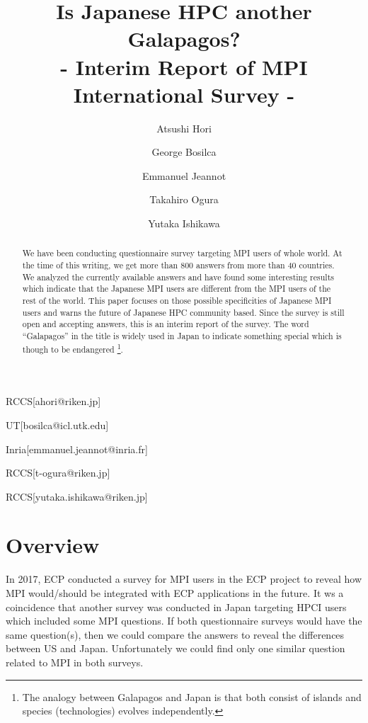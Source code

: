 \documentclass[submit,techrep,noauthor,english]{ipsj}
\begin{document}
\title{Is Japanese HPC another Galapagos?\\
- Interim Report of MPI International Survey -}


\author{Atsushi Hori}{RCCS}[ahori@riken.jp]
\author{George Bosilca}{UT}[bosilca@icl.utk.edu]
\author{Emmanuel Jeannot}{Inria}[emmanuel.jeannot@inria.fr]
\author{Takahiro Ogura}{RCCS}[t-ogura@riken.jp]
\author{Yutaka Ishikawa}{RCCS}[yutaka.ishikawa@riken.jp]

\begin{abstract}
We have been conducting questionnaire survey targeting MPI users of
whole world.  At the time of this writing, we get more than 800
answers from more than 40 countries.
We analyzed the currently available answers and have found some
interesting results which indicate that the Japanese MPI users are
different from the MPI users of the rest of the world. This paper focuses
on those possible specificities of Japanese MPI users and warns
the future of Japanese HPC community based. Since the survey is still
open and accepting answers, this is an interim report of the survey.
The word ``Galapagos'' in the title is widely used in Japan to
indicate something special which is though to be endangered%
\footnote{The analogy between Galapagos and Japan is that both consist
  of islands and species (technologies) evolves independently.}.  
\end{abstract}

\maketitle

\section{Overview}

In 2017, ECP\cite{ECP} conducted a survey for MPI users in the ECP
project to reveal how MPI would/should be integrated with ECP
applications in the future\cite{osti_1462877}.  It ws a coincidence
that another survey was conducted in Japan targeting HPCI\cite{HPCI}
users which included some MPI questions\cite{hpci-user-survey}.  If
both questionnaire surveys would have the same question(s), then we could
compare the answers to reveal the differences between US and
Japan. Unfortunately we could find only one similar question
related to MPI in both surveys.
\end{document}
